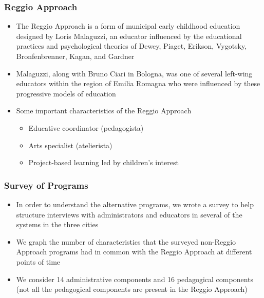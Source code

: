 \documentclass[static]{JJH-Beamer_PAGENOS}
\begin{document}
\begin{frame}
\frametitle{Reggio Approach}
\begin{itemize}
	\item The Reggio Approach is a form of municipal early childhood education designed by Loris Malaguzzi, an educator influenced by the educational practices and psychological theories of Dewey, Piaget, Erikson, Vygotsky, Bronfenbrenner, Kagan, and Gardner
	\item Malaguzzi, along with Bruno Ciari in Bologna, was one of several left-wing educators within the region of Emilia Romagna who were influenced by these progressive models of education \citep{Cagliari-etal-eds_2016_BOOK_Loris-Malaguzzi}
	\item Some important characteristics of the Reggio Approach
	\begin{itemize}
		\item Educative coordinator (pedagogista)
		\item Arts specialist (atelierista)
		\item Project-based learning led by children's interest 
	\end{itemize}
\end{itemize}
\end{frame}


\begin{frame}
\frametitle{Survey of Programs}
\begin{itemize}
	\item In order to understand the alternative programs, we wrote a survey to help structure interviews with administrators and educators in several of the systems in the three cities
	\item We graph the number of characteristics that the surveyed non-Reggio Approach programs had in common with the Reggio Approach at different points of time
	\item We consider 14 administrative components and 16 pedagogical components (not all the pedagogical components are present in the Reggio Approach)
\end{itemize}
\end{frame}
\end{document}
